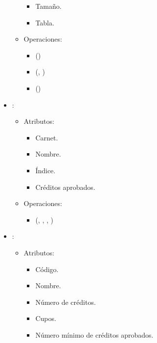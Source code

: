 \documentclass[11pt]{article}
\begin{document}
\begin{itemize}
\begin{itemize}
         \begin{itemize}
            \item Tamaño.
            \item Tabla.
         \end{itemize}
      \end{itemize}

      \begin{itemize}
         \item Operaciones:
         
         \begin{itemize}
            \item {}()
            \item {}(, )
            \item {}()
         \end{itemize}
      \end{itemize}

      \item {}:
      \begin{itemize}
         \item Atributos:

         \begin{itemize}
            \item Carnet.
            \item Nombre.
            \item Índice.
            \item Créditos aprobados.
         \end{itemize}
      \end{itemize}

      \begin{itemize}
         \item Operaciones:
         
         \begin{itemize}
            \item {}(, , , )
         \end{itemize}
      \end{itemize}

      \item {}:
      \begin{itemize}
         \item Atributos:

         \begin{itemize}
            \item Código.
            \item Nombre.
            \item Número de créditos.
            \item Cupos.
            \item Número mínimo de créditos aprobados.
         \end{itemize}
      \end{itemize}


\end{itemize}
\end{document}
